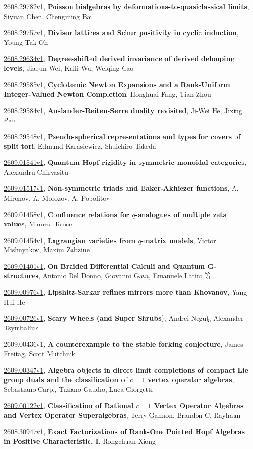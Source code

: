 \documentclass[9pt, a4paper]{article}
\theoremstyle{plain}
\theoremstyle{definition}
\theoremstyle{remark}
\newcommand{\arxiv}[3]{\href{https://arxiv.org/abs/#1}{#1}, \textbf{\textcolor{arxivblue}{#2}}, #3}
\begin{document}
\arxiv{2608.29782v1}{Poisson bialgebras by deformations-to-quasiclassical limits}{Siyuan Chen, Chengming Bai}

\arxiv{2608.29757v1}{Divisor lattices and Schur positivity in cyclic induction}{Young-Tak Oh}

\arxiv{2608.29634v1}{Degree-shifted derived invariance of derived delooping levels}{Jiaqun Wei, Kaili Wu, Weiqing Cao}

\arxiv{2608.29585v1}{Cyclotomic Newton Expansions and a Rank-Uniform Integer-Valued Newton Completion}{Honghuai Fang, Tian Zhou}

\arxiv{2608.29584v1}{Auslander-Reiten-Serre duality revisited}{Ji-Wei He, Jixing Pan}

\arxiv{2608.29548v1}{Pseudo-spherical representations and types for covers of split tori}{Edmund Karasiewicz, Shuichiro Takeda}

\arxiv{2609.01541v1}{Quantum Hopf rigidity in symmetric monoidal categories}{Alexandru Chirvasitu}

\arxiv{2609.01517v1}{Non-symmetric triads and Baker-Akhiezer functions}{A. Mironov, A. Morozov, A. Popolitov}

\arxiv{2609.01458v1}{Confluence relations for $q$-analogues of multiple zeta values}{Minoru Hirose}

\arxiv{2609.01454v1}{Lagrangian varieties from $q$-matrix models}{Victor Mishnyakov, Maxim Zabzine}

\arxiv{2609.01401v1}{On Braided Differential Calculi and Quantum G-structures}{Antonio Del Donno, Giovanni Gava, Emanuele Latini 等}

\arxiv{2609.00976v1}{Lipshitz-Sarkar refines mirrors more than Khovanov}{Yang-Hui He}

\arxiv{2609.00726v1}{Scary Wheels (and Super Shrubs)}{Andrei Neguţ, Alexander Tsymbaliuk}

\arxiv{2609.00436v1}{A counterexample to the stable forking conjecture}{James Freitag, Scott Mutchnik}

\arxiv{2609.00347v1}{Algebra objects in direct limit completions of compact Lie group duals and the classification of $c=1$ vertex operator algebras}{Sebastiano Carpi, Tiziano Gaudio, Luca Giorgetti}

\arxiv{2609.00122v1}{Classification of Rational $c=1$ Vertex Operator Algebras and Vertex Operator Superalgebras}{Terry Gannon, Brandon C. Rayhaun}

\arxiv{2608.30947v1}{Exact Factorizations of Rank-One Pointed Hopf Algebras in Positive Characteristic, I}{Rongchuan Xiong}
\end{document}
